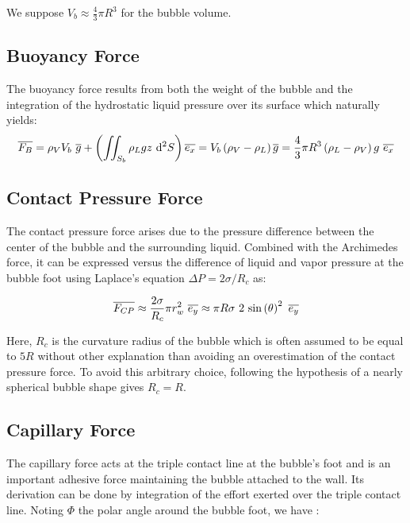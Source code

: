 We suppose $V_{b}\approx\frac{4}{3}\pi R^{3}$ for the bubble volume.





\subsection{Buoyancy Force}


The buoyancy force results from both the weight of the bubble and the integration of the hydrostatic liquid pressure over its surface which naturally yields:
\begin{equation}
\vect{F_{B}}= \rho_{V}V_{b}\ \vect{g} + \parth{\iint_{S_{b}} \rho_{L} g z\ \mathrm{d}^{2}S}\vect{e_{x}} = V_{b}\parth{\rho_{V}-\rho_{L}}\vect{g}=\frac{4}{3}\pi R^{3}\parth{\rho_{L}-\rho_{V}}g \ \vect{e_{x}}
\label{eq:force_buoyancy}
\end{equation}

\subsection{Contact Pressure Force}

The contact pressure force arises due to the pressure difference between the center of the bubble and the surrounding liquid.  Combined with the Archimedes force, it can be expressed versus the difference of liquid and vapor pressure at the bubble foot using Laplace's equation $\Delta P = 2\sigma / R_{c}$ as:

\begin{align}
\overline{F_{CP}}  \approx \frac{2\sigma}{R_{c}} \pi r_{w}^{2}\  \overline{e_{y}}
\approx \pi R \sigma\ 2\ \mathrm{sin}\left( \theta \right)^{2}\ \overline{e_{y}}
\label{eq:FCP}
\end{align}

Here, $R_{c}$ is the curvature radius of the bubble which is often assumed to be equal to $5R$ \cite{klausner_vapor_1993, sugrue_modified_2016, mazzocco_reassessed_2018} without other explanation than avoiding an overestimation of the contact pressure force. To avoid this arbitrary choice, following the hypothesis of a nearly spherical bubble shape gives $R_{c}=R$.


\subsection{Capillary Force}

The capillary force acts at the triple contact line at the bubble's foot and is an important adhesive force maintaining the bubble attached to the wall. Its derivation can be done by integration of the effort exerted over the triple contact line. Noting $\Phi$ the polar angle around the bubble foot, we have :


